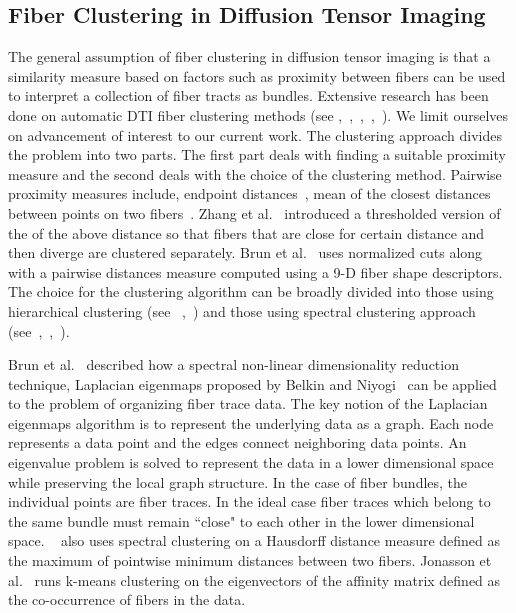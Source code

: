 \subsection {Fiber Clustering in Diffusion Tensor Imaging}
\label {subsec:fiberClus}

The general assumption of fiber clustering in diffusion tensor imaging is that a similarity measure based on factors such as proximity between fibers can be used to interpret a collection of fiber tracts as bundles.  Extensive research has been done on automatic DTI fiber clustering methods (see \cite{Corouge2004},~\cite{Brun2003},~\cite{Brun2004},~\cite{Zhang2008},~\cite{westinMEDIA02}). We limit ourselves on advancement of interest to our current work.
 The clustering approach divides the problem into two parts. The first part deals with finding a suitable proximity measure and the second deals with the choice of the clustering method. Pairwise proximity measures include, endpoint distances~\cite{Brun2003},  mean of the closest distances between points on two fibers~\cite{Corouge2004}. Zhang et al.~\cite{Zhang2008} introduced a thresholded version of the of the above distance so that fibers that are close for certain distance and then  diverge are clustered separately. Brun et al.~\cite{Brun2004} uses normalized cuts along with a pairwise distances  measure computed using a 9-D fiber shape descriptors. The choice for the clustering algorithm can be broadly divided into those using hierarchical clustering (see ~\cite{Moberts2005},~\cite{Zhang2008}) and those using spectral clustering approach (see~\cite{jonasson2005},~\cite{ODonnell2007},~\cite{Brun2004}).
 
Brun et al.~\cite{Brun2003} described how a spectral non-linear dimensionality reduction technique,  Laplacian eigenmaps proposed by Belkin and Niyogi~\cite{Belkin01} can be applied to the problem of organizing fiber trace data. The key notion of the Laplacian eigenmaps algorithm is to represent the underlying data as a graph. Each node represents a data point and the edges connect neighboring data points. An eigenvalue problem is solved to represent the data in a lower dimensional space while preserving the local graph structure. In the case of fiber bundles, the individual points are fiber traces. In the ideal case fiber traces which belong to the same bundle must remain ``close" to each other in the lower dimensional space. ~\cite{westinMEDIA02} also uses spectral clustering on a Hausdorff distance measure defined as the maximum of pointwise minimum distances between two fibers. Jonasson et al.~\cite{jonasson2005} runs k-means clustering on the eigenvectors of the affinity matrix defined as the co-occurrence of fibers in the data.

